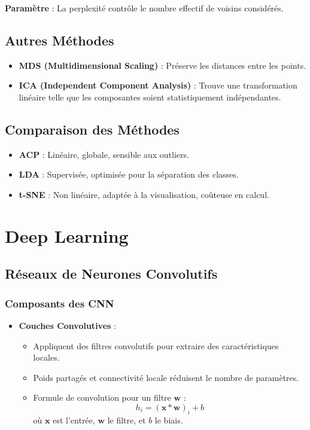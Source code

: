 \documentclass[a4paper,portrait]{article}
\begin{document}
\begin{multicols}{2}
\textbf{Paramètre} : La perplexité contrôle le nombre effectif de voisins considérés.


\subsection{Autres Méthodes}

\begin{itemize}
    \item \textbf{MDS (Multidimensional Scaling)} : Préserve les distances entre les points.
    \item \textbf{ICA (Independent Component Analysis)} : Trouve une transformation linéaire telle que les composantes soient statistiquement indépendantes.
\end{itemize}



\subsection{Comparaison des Méthodes}

\begin{itemize}
    \item \textbf{ACP} : Linéaire, globale, sensible aux outliers.
    \item \textbf{LDA} : Supervisée, optimisée pour la séparation des classes.
    \item \textbf{t-SNE} : Non linéaire, adaptée à la visualisation, coûteuse en calcul.
\end{itemize}

\newpage

\section{Deep Learning}

\subsection{Réseaux de Neurones Convolutifs}

\subsubsection{Composants des CNN}

\begin{itemize}
    \item \textbf{Couches Convolutives} :
    \begin{itemize}
        \item Appliquent des filtres convolutifs pour extraire des caractéristiques locales.
        \item Poids partagés et connectivité locale réduisent le nombre de paramètres.
        \item Formule de convolution pour un filtre \( \mathbf{w} \) :
        \[
        h_i = (\mathbf{x} * \mathbf{w})_i + b
        \]
        où \( \mathbf{x} \) est l'entrée, \( \mathbf{w} \) le filtre, et \( b \) le biais.
    \end{itemize}


\end{itemize}
\end{multicols}
\end{document}
